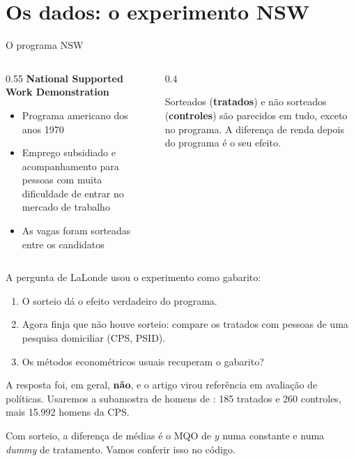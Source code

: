 \documentclass[aspectratio=169,11pt]{beamer}
\begin{document}
\section{Os dados: o experimento NSW}

\begin{frame}{O programa NSW}
  \begin{columns}[T]
    \begin{column}{0.55\textwidth}
      \textbf{National Supported Work Demonstration}
      \begin{itemize}
        \item Programa americano dos anos 1970
        \item Emprego subsidiado e acompanhamento para pessoas com muita
              dificuldade de entrar no mercado de trabalho
        \item As vagas foram \alert{sorteadas} entre os candidatos
      \end{itemize}
    \end{column}
    \begin{column}{0.4\textwidth}
      \begin{exemplo}[title={Por que o sorteio importa}]
        \small Sorteados (\textbf{tratados}) e não sorteados (\textbf{controles})
        são parecidos em tudo, exceto no programa. A diferença de renda
        depois do programa é o seu \alert{efeito}.
      \end{exemplo}
    \end{column}
  \end{columns}
\end{frame}

\begin{frame}{A pergunta de LaLonde}
  \textcite{lalonde1986} usou o experimento como \alert{gabarito}:
  \begin{enumerate}
    \item O sorteio dá o efeito verdadeiro do programa.
    \item Agora finja que não houve sorteio: compare os tratados com pessoas de
          uma pesquisa domiciliar (CPS, PSID).
    \item Os métodos econométricos usuais \alert{recuperam o gabarito}?
  \end{enumerate}
  \smallskip
  A resposta foi, em geral, \textbf{não}, e o artigo virou referência em
  avaliação de políticas. Usaremos a subamostra de homens de
  \textcite{dehejia1999}: 185 tratados e 260 controles, mais 15.992 homens da CPS.
  \begin{conexao}
    \small Com sorteio, a diferença de médias é o MQO de $y$ numa constante e numa
    \emph{dummy} de tratamento. Vamos conferir isso no código.
  \end{conexao}
\end{frame}
\end{document}
